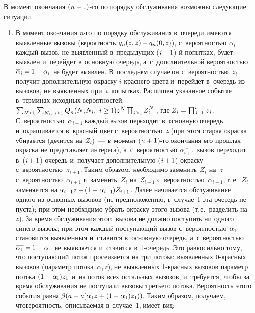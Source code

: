 \begin{multicols}{2}
  В момент окончания $(n\hm+1)$-го по порядку обслуживания возможны 
следующие ситуации.
  \begin{enumerate}
  \item В момент окончания $n$-го по порядку обслуживания в~очереди 
имеются выявленные вызовы (ве\-роят\-ность $q_n(z,\overline{z})\hm- 
q_n(0,\overline{z})$), с~ве\-ро\-ят\-ностью~$\alpha_i$ каждый вызов, не выявленный 
в~предыду\-щих ($i\hm-1$)-й попытках, будет выявлен и~перейдет в~основную 
очередь, а~с~дополнительной вероятностью $\overline{\alpha}_i\hm= 1\hm- 
\alpha_i$ не будет выявлен. В~последнем случае он с~вероятностью~$z_i$ 
получит дополнительную окраску $i$-крас\-но\-го цвета и~перейдет в~очередь 
из вызовов, не выявленных при~$i$~попытках. Распишем указанное событие 
в~терминах исходных вероятностей: $\sum\nolimits_{N\geq1} 
\sum\nolimits_{N_i,\ i\geq1} Q_n(N; N_i,\ i\hm\geq1) z^N \prod\nolimits_{i\geq 1} 
Z_i^{N_i}$, где $Z_i\hm= \prod\nolimits^i_{j=1} z_j$. 
С~ве\-ро\-ят\-ностью~$\alpha_{i+1}$ каждый вызов переходит в~основную очередь 
и~окрашивается в~красный цвет с~ве\-ро\-ят\-ностью~$z$ (при этом старая окраска 
убирается (делится на~$Z_i$)~--- в~момент  
($n\hm+1$)-го окончания его прошлая окрас\-ка не представляет интереса), 
а~с~вероятностью $\overline{\alpha_{i+1}}$ вызов переходит  
в~($i\hm+1$)-очередь и~получает дополнительную  
($i\hm+1$)-окраску с~ве\-ро\-ят\-ностью~$z_{i+1}$. Таким образом, необходимо 
заменить~$Z_i$ на~$z$ с~ве\-ро\-ят\-ностью~$\alpha_{i+1}$ и~заменить~$Z_i$ 
на~$Z_{i+1}$ с~вероятностью~$\overline{\alpha_{i+1}}$, т.\,е.~$Z_i$ 
заменяется на $\alpha_{i+1} z\hm+ (1\hm- \alpha_{i+1})Z_{i+1}$. Далее 
начинается обслуживание одного из основных вызовов (по предположению, 
в~случае~1 эта очередь не пуста); при этом необходимо убрать окраску этого 
вызова (т.\,е.\ разделить на~$z$). За время обслуживания этого вызова не 
должно поступить ни одного синего вызова; при этом каж\-дый поступающий 
вызов с~ве\-ро\-ят\-ностью~$\alpha_1$ становится выявленным и~ставится 
в~основную очередь, а~с~ве\-ро\-ят\-ностью~$\overline{\alpha_1}\hm=1-\alpha_1$ не 
выявляется и~ставится в~1-оче\-редь. Это равносильно тому, что по\-сту\-па\-ющий 
поток просеивается на три потока: выявленных 0-крас\-ных вызовов (параметр 
потока~$\alpha_1z$), не выявленных 1-крас\-ных вызовов параметр потока 
$(1\hm-\alpha_1)z_1$ и~на поток всех остальных вызовов, и~требуется, чтобы за 
время обслуживания не поступали вызовы третьего потока. Ве\-ро\-ят\-ность этого 
события равна $\beta(a\hm- a(\alpha_1 z\hm+ (1\hm- \alpha_1)z_1))$. Таким 
образом, получаем, что\linebreak вероятность, описываемая в~случае~1, имеет вид: 

\end{enumerate}
\end{multicols}
